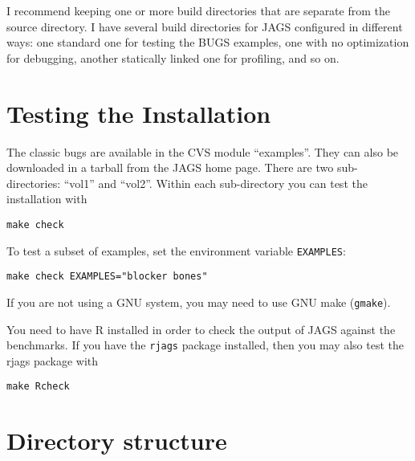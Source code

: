 \documentclass[11pt, a4paper, titlepage]{report}
\begin{document}
I recommend keeping one or more build directories that are separate
from the source directory. I have several build directories for JAGS
configured in different ways: one standard one for testing the BUGS
examples, one with no optimization for debugging, another statically
linked one for profiling, and so on.

\chapter{Testing the Installation}

The classic bugs are available in the CVS module ``examples''. They
can also be downloaded in a tarball from the JAGS home page. There are
two sub-directories: ``vol1'' and ``vol2''. Within each sub-directory
you can test the installation with
\begin{verbatim}
make check
\end{verbatim}
To test a subset of examples, set the environment variable \verb+EXAMPLES+:
\begin{verbatim}
make check EXAMPLES="blocker bones"
\end{verbatim}
If you are not using a GNU system, you may need to use GNU make
(\verb+gmake+).

You need to have R installed in order to check the output of JAGS
against the benchmarks.  If you have the \texttt{rjags} package
installed, then you may also test the rjags package with
\begin{verbatim}
make Rcheck
\end{verbatim}

\chapter{Directory structure}
\end{document}
